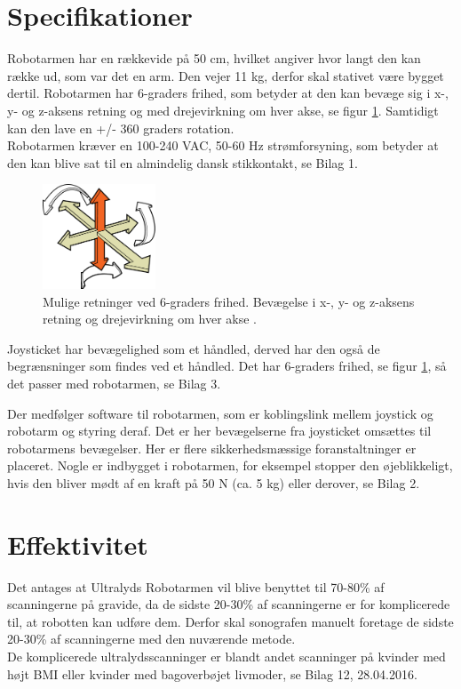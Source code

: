 \section{Specifikationer}
Robotarmen har en rækkevide på 50 cm, hvilket angiver hvor langt den kan række ud, som var det en arm. Den vejer 11 kg, derfor skal stativet være bygget dertil. Robotarmen har 6-graders frihed, som betyder at den kan bevæge sig i x-, y- og z-aksens retning og med drejevirkning om hver akse, se figur \ref{seksgradersfrihed}. Samtidigt kan den lave en +/- 360 graders rotation. \\
Robotarmen kræver en 100-240 VAC, 50-60 Hz strømforsyning, som betyder at den kan blive sat til en almindelig dansk stikkontakt, se Bilag 1.
  
\begin{figure}[H]\centering
	\includegraphics[width = 0.3\textwidth]{Figurer/sixDegressOfFreedom.jpg}
	\caption{Mulige retninger ved 6-graders frihed. Bevægelse i x-, y- og z-aksens retning og drejevirkning om hver akse \cite{6gradersfrihed}. }
	\label{seksgradersfrihed}
\end{figure}

Joysticket har bevægelighed som et håndled, derved har den også de begrænsninger som findes ved et håndled. Det har 6-graders frihed, se figur \ref{seksgradersfrihed}, så det passer med robotarmen, se Bilag 3. 

Der medfølger software til robotarmen, som er koblingslink mellem joystick og robotarm og styring deraf. Det er her bevægelserne fra joysticket omsættes til robotarmens bevægelser. Her er flere sikkerhedsmæssige foranstaltninger er placeret. Nogle er indbygget i robotarmen, for eksempel stopper den øjeblikkeligt, hvis den bliver mødt af en kraft på 50 N (ca. 5 kg) eller derover, se Bilag 2.    

\section{Effektivitet}
Det antages at Ultralyds Robotarmen vil blive benyttet til 70-80\% af scanningerne på gravide, da de sidste 20-30\% af scanningerne er for komplicerede til, at robotten kan udføre dem. Derfor skal sonografen manuelt foretage de sidste 20-30\% af scanningerne med den nuværende metode. \\ 
De komplicerede ultralydsscanninger er blandt andet scanninger på kvinder med højt BMI eller kvinder med bagoverbøjet livmoder, se Bilag 12, 28.04.2016. 
 
